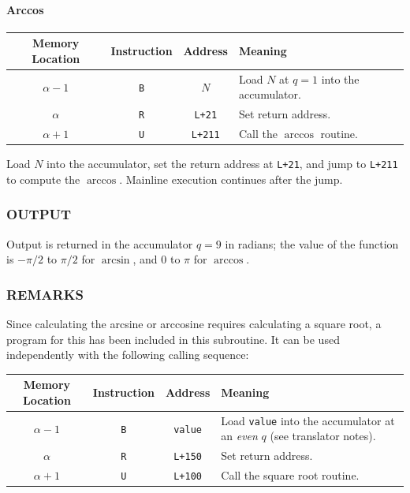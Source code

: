 \paragraph{Arccos}
\begin{center}
\begin{tabularx}{\textwidth}{cccX}
\toprule
\textbf{Memory Location} & \textbf{Instruction} & \textbf{Address} & \textbf{Meaning} \\
\midrule
$\alpha-1$      & \texttt{B} & $N$                  & Load $N$ at $q=1$ into the accumulator.\\
$\alpha$   & \texttt{R} & \texttt{L+21}         & Set return address. \\
$\alpha+1$      & \texttt{U}  & \texttt{L+211}    & Call the $\arccos$ routine.\\
\bottomrule
\end{tabularx}
\end{center}

Load $N$ into the accumulator, set the return address at \texttt{L+21}, and jump to \texttt{L+211} to compute the $\arccos$. Mainline execution continues after the jump.

\subsubsection*{OUTPUT}
Output is returned in the accumulator $q=9$ in radians; the value of the function is $-\pi/2$ to $\pi/2$ for $\arcsin$, and $0$ to $\pi$ for $\arccos$.

\subsubsection*{REMARKS}
Since calculating the arcsine or arccosine requires calculating a square root, a program for this has been included in this subroutine. It can be used independently with the following calling sequence:
\begin{table}[h!]
\centering
\begin{tabularx}{\textwidth}{cccX}
\toprule
\textbf{Memory Location} & \textbf{Instruction} & \textbf{Address} & \textbf{Meaning} \\
\midrule
$\alpha-1$ & \texttt{B} & \texttt{value}  & Load \texttt{value} into the accumulator at an \emph{even} $q$ (see translator notes). \\
$\alpha$   & \texttt{R} & \texttt{L+150}  & Set return address. \\
$\alpha+1$ & \texttt{U} & \texttt{L+100}  & Call the square root routine. \\
\bottomrule
\end{tabularx}
\end{table}

